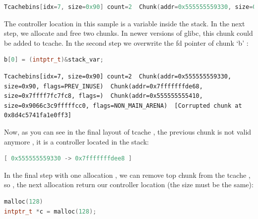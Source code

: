 \documentclass{masterthesis}
\newcommand*\libc{glibc}
\newcommand*\tch{tcache}
\begin{document}
\begin{lstlisting}[language=c,frame=tlrb]
Tcachebins[idx=7, size=0x90] count=2  Chunk(addr=0x555555559330, size=0x90, flags=PREV_INUSE)  Chunk(addr=0x5555555592a0, size=0x90, flags=PREV_INUSE) 
\end{lstlisting}

The controller location in this sample is a variable inside the stack. In the next step, we allocate and free two chunks. In newer versions of \libc{}, this chunk could be added to \tch{}.
In the second step we overwrite the fd pointer of chunk ‘b’ :

\begin{lstlisting}[language=c,frame=tlrb]
b[0] = (intptr_t)&stack_var;
\end{lstlisting}

\begin{lstlisting}[frame=tlrb]
Tcachebins[idx=7, size=0x90] count=2  Chunk(addr=0x555555559330, size=0x90, flags=PREV_INUSE)  Chunk(addr=0x7fffffffde68, size=0x7ffff7fc7fc8, flags=)  Chunk(addr=0x555555555410, size=0x9066c3c9fffffcc0, flags=NON_MAIN_ARENA)  [Corrupted chunk at 0x8d4c5741fa1e0ff3]
\end{lstlisting}

Now, as you can see in the final layout of \tch{} , the previous chunk is not valid anymore , it is a controller located in the stack:
\begin{lstlisting}[language=c,frame=tlrb]
[ 0x555555559330 -> 0x7fffffffdee8 ]
\end{lstlisting}
In the final step with one allocation , we can remove top chunk from the \tch{} , so , the next allocation return our controller location (the size must be the same): 
\begin{lstlisting}[language=c,frame=tlrb]
malloc(128)
intptr_t *c = malloc(128);
\end{lstlisting}
\end{document}
